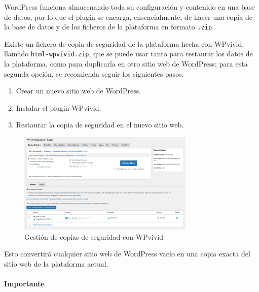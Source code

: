                 WordPress funciona almacenando toda su configuración y contenido en una base de datos, por lo que el plugin se encarga, ensencialmente, de hacer una copia de la base de datos y de los ficheros de la plataforma en formato \texttt{.zip}.

                Existe un fichero de copia de seguridad de la plataforma hecha con WPvivid, llamado \texttt{html-wpvivid.zip}, que se puede usar tanto para restaurar los datos de la plataforma, como para duplicarla en otro sitio web de WordPress; para esta segunda opción, se recomienda seguir los siguientes pasos:
                
                \begin{enumerate}
                    \item Crear un nuevo sitio web de WordPress.
                    \item Instalar el plugin WPvivid.
                    \item Restaurar la copia de seguridad en el nuevo sitio web.
                \end{enumerate}

                \begin{figure}
                    \centering

                    \includegraphics[width=0.75\textwidth]{images/Capturas/localhost/wpvivid.png}

                    \caption{Gestión de copias de seguridad con WPvivid}
                    \label{fig:wpvivid}
                \end{figure}

                Esto convertirá cualquier sitio web de WordPress vacío en una copia exacta del sitio web de la plataforma actual.
                
                \paragraph{Importante}
                
